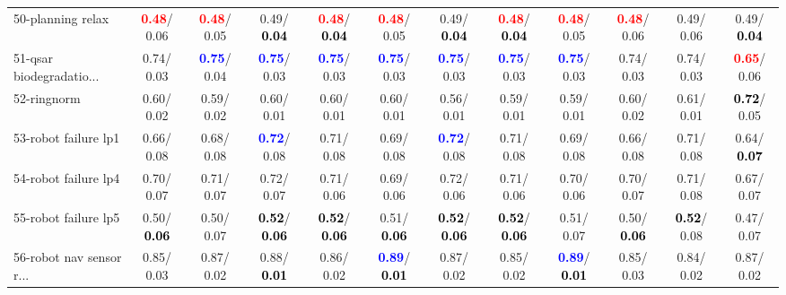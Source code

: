 \begin{table}[h]
\begin{center}
{\begin{tabular}{lc|c|c|c|c|c|c|c|c|c|c}
50-planning relax & \textcolor{red}{\textbf{  0.48}}/  0.06 & \textcolor{red}{\textbf{  0.48}}/  0.05 &   0.49/\textcolor{black}{\textbf{  0.04}} & \textcolor{red}{\textbf{  0.48}}/\textcolor{black}{\textbf{  0.04}} & \textcolor{red}{\textbf{  0.48}}/  0.05 &   0.49/\textcolor{black}{\textbf{  0.04}} & \textcolor{red}{\textbf{  0.48}}/\textcolor{black}{\textbf{  0.04}} & \textcolor{red}{\textbf{  0.48}}/  0.05 & \textcolor{red}{\textbf{  0.48}}/  0.06 &   0.49/  0.06 &   0.49/\textcolor{black}{\textbf{  0.04}} \\
51-qsar biodegradatio... &   0.74/  0.03 & \textcolor{blue}{\textbf{  0.75}}/  0.04 & \textcolor{blue}{\textbf{  0.75}}/  0.03 & \textcolor{blue}{\textbf{  0.75}}/  0.03 & \textcolor{blue}{\textbf{  0.75}}/  0.03 & \textcolor{blue}{\textbf{  0.75}}/  0.03 & \textcolor{blue}{\textbf{  0.75}}/  0.03 & \textcolor{blue}{\textbf{  0.75}}/  0.03 &   0.74/  0.03 &   0.74/  0.03 & \textcolor{red}{\textbf{  0.65}}/  0.06 \\
52-ringnorm &   0.60/  0.02 &   0.59/  0.02 &   0.60/  0.01 &   0.60/  0.01 &   0.60/  0.01 &   0.56/  0.01 &   0.59/  0.01 &   0.59/  0.01 &   0.60/  0.02 &   0.61/  0.01 & \textcolor{black}{\textbf{  0.72}}/  0.05 \\
53-robot failure lp1 &   0.66/  0.08 &   0.68/  0.08 & \textcolor{blue}{\textbf{  0.72}}/  0.08 &   0.71/  0.08 &   0.69/  0.08 & \textcolor{blue}{\textbf{  0.72}}/  0.08 &   0.71/  0.08 &   0.69/  0.08 &   0.66/  0.08 &   0.71/  0.08 &   0.64/\textcolor{black}{\textbf{  0.07}} \\ \hline
54-robot failure lp4 &   0.70/  0.07 &   0.71/  0.07 &   0.72/  0.07 &   0.71/  0.06 &   0.69/  0.06 &   0.72/  0.06 &   0.71/  0.06 &   0.70/  0.06 &   0.70/  0.07 &   0.71/  0.08 &   0.67/  0.07 \\
55-robot failure lp5 &   0.50/\textcolor{black}{\textbf{  0.06}} &   0.50/  0.07 & \textcolor{black}{\textbf{  0.52}}/\textcolor{black}{\textbf{  0.06}} & \textcolor{black}{\textbf{  0.52}}/\textcolor{black}{\textbf{  0.06}} &   0.51/\textcolor{black}{\textbf{  0.06}} & \textcolor{black}{\textbf{  0.52}}/\textcolor{black}{\textbf{  0.06}} & \textcolor{black}{\textbf{  0.52}}/\textcolor{black}{\textbf{  0.06}} &   0.51/  0.07 &   0.50/\textcolor{black}{\textbf{  0.06}} & \textcolor{black}{\textbf{  0.52}}/  0.08 &   0.47/  0.07 \\
56-robot nav sensor r... &   0.85/  0.03 &   0.87/  0.02 &   0.88/\textcolor{black}{\textbf{  0.01}} &   0.86/  0.02 & \textcolor{blue}{\textbf{  0.89}}/\textcolor{black}{\textbf{  0.01}} &   0.87/  0.02 &   0.85/  0.02 & \textcolor{blue}{\textbf{  0.89}}/\textcolor{black}{\textbf{  0.01}} &   0.85/  0.03 &   0.84/  0.02 &   0.87/  0.02 \\

\end{tabular}}
\end{center}
\end{table}
